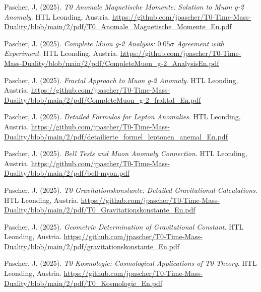 \documentclass{article}
\begin{document}
\begin{thebibliography}{99}
		
		Pascher, J. (2025).
		\textit{T0 Anomale Magnetische Momente: Solution to Muon g-2 Anomaly}.
		HTL Leonding, Austria.
		\url{https://github.com/jpascher/T0-Time-Mass-Duality/blob/main/2/pdf/T0_Anomale_Magnetische_Momente_En.pdf}
		
		Pascher, J. (2025).
		\textit{Complete Muon g-2 Analysis: $0.05\sigma$ Agreement with Experiment}.
		HTL Leonding, Austria.
		\url{https://github.com/jpascher/T0-Time-Mass-Duality/blob/main/2/pdf/CompleteMuon_g-2_AnalysisEn.pdf}
		
		Pascher, J. (2025).
		\textit{Fractal Approach to Muon g-2 Anomaly}.
		HTL Leonding, Austria.
		\url{https://github.com/jpascher/T0-Time-Mass-Duality/blob/main/2/pdf/CompleteMuon_g-2_fraktal_En.pdf}
		
		Pascher, J. (2025).
		\textit{Detailed Formulas for Lepton Anomalies}.
		HTL Leonding, Austria.
		\url{https://github.com/jpascher/T0-Time-Mass-Duality/blob/main/2/pdf/detailierte_formel_leptonen_anemal_En.pdf}
		
		Pascher, J. (2025).
		\textit{Bell Tests and Muon Anomaly Connection}.
		HTL Leonding, Austria.
		\url{https://github.com/jpascher/T0-Time-Mass-Duality/blob/main/2/pdf/bell-myon.pdf}
		
		
		Pascher, J. (2025).
		\textit{T0 Gravitationskonstante: Detailed Gravitational Calculations}.
		HTL Leonding, Austria.
		\url{https://github.com/jpascher/T0-Time-Mass-Duality/blob/main/2/pdf/T0_Gravitationskonstante_En.pdf}
		
		Pascher, J. (2025).
		\textit{Geometric Determination of Gravitational Constant}.
		HTL Leonding, Austria.
		\url{https://github.com/jpascher/T0-Time-Mass-Duality/blob/main/2/pdf/gravitationskonstante_En.pdf}
		
		
		Pascher, J. (2025).
		\textit{T0 Kosmologie: Cosmological Applications of T0 Theory}.
		HTL Leonding, Austria.
		\url{https://github.com/jpascher/T0-Time-Mass-Duality/blob/main/2/pdf/T0_Kosmologie_En.pdf}
		

\end{thebibliography}
\end{document}
